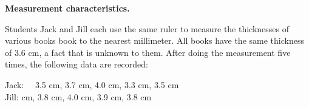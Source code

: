 \documentclass[11pt]{article}\usepackage[]{graphicx}\usepackage[]{color}
\newcommand{\blue}[1]{{\color{blue} #1}}
\newcommand{\ben}{\begin{enumerate}}
\newcommand{\een}{\end{enumerate}}
\begin{document}

%
%
%

\item \textbf{Measurement characteristics.}

Students Jack and Jill each use the same ruler to measure
the thicknesses of various books 
book to the nearest millimeter.  All books have the same thickness of 3.6 cm,
a fact that is unknown to them.
After doing the measurement five times, 
the following data are recorded: 
\begin{tabbing}
\qquad \=Jack: \ \ \= 3.5 cm, 3.7 cm, 4.0 cm, 3.3 cm, 3.5 cm \\
 \> Jill: cm, 3.8 cm, 4.0 cm, 3.9 cm, 3.8 cm 
\end{tabbing}
 
\end{document}
